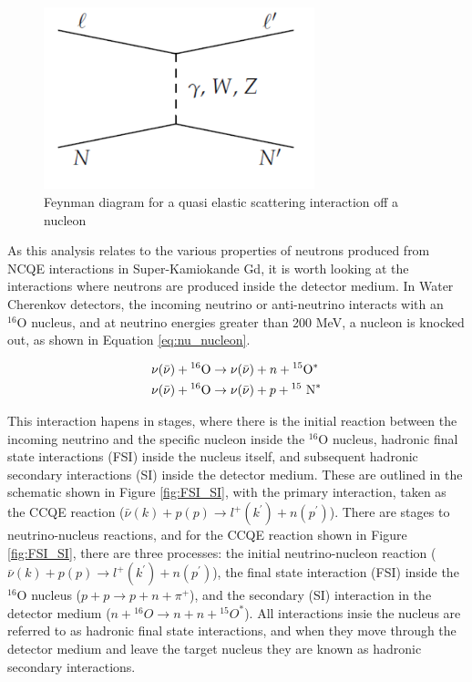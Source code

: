 \begin{figure}
    \centering
    \includegraphics[width=0.7\textwidth]{Figures/QE_feynman.png}
    \caption{Feynman diagram for a quasi elastic scattering interaction off a nucleon}
    \label{fig:QE_reaction}
\end{figure}



As this analysis relates to the various properties of neutrons produced from NCQE interactions in Super-Kamiokande Gd, it is worth looking at the interactions where neutrons are produced inside the detector medium. In Water Cherenkov detectors, the incoming neutrino or anti-neutrino interacts with an ${ }^{16} \mathrm{O}$ nucleus, and at neutrino energies greater than 200 MeV, a nucleon is knocked out, as shown in Equation \ref{eq:nu_nucleon}.

\begin{align}
&\nu(\bar{\nu})+{ }^{16} \mathrm{O} \rightarrow \nu(\bar{\nu})+n+{ }^{15} \mathrm{O}^{*} \label{eq:nu_nucleon} \\
&\nu(\bar{\nu})+{ }^{16} \mathrm{O} \rightarrow \nu(\bar{\nu})+p+{ }^{15} \mathrm{~N}^{*} \notag
\end{align}


This interaction hapens in stages, where there is the initial reaction between the incoming neutrino and the specific nucleon inside the ${ }^{16} \mathrm{O}$ nucleus, hadronic final state interactions (FSI) inside the nucleus itself, and subsequent hadronic secondary interactions (SI) inside the detector medium. These are outlined in the schematic shown in Figure \ref{fig:FSI_SI}, with the primary interaction, taken as the CCQE reaction ($\bar{\nu}(k)+p(p) \rightarrow l^{+}\left(k^{\prime}\right)+n\left(p^{\prime}\right)$).
There are stages to neutrino-nucleus reactions, and for the CCQE reaction shown in Figure \ref{fig:FSI_SI}, there are three processes: the initial neutrino-nucleon reaction ($\bar{\nu}(k)+p(p) \rightarrow l^{+}\left(k^{\prime}\right)+n\left(p^{\prime}\right)$), the final state interaction (FSI) inside the ${ }^{16} \mathrm{O}$ nucleus ($p+p \rightarrow p+n+\pi^{+}$), and the secondary (SI) interaction in the detector medium ($n+{ }^{16} O \rightarrow n+n+{ }^{15} O^{*}$). All interactions insie the nucleus are referred to as hadronic final state interactions, and when they move through the detector medium and leave the target nucleus they are known as hadronic secondary interactions. 


